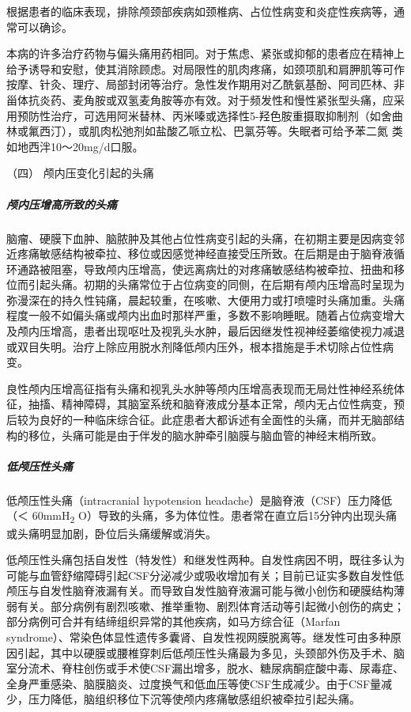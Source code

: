 根据患者的临床表现，排除颅颈部疾病如颈椎病、占位性病变和炎症性疾病等，通常可以确诊。

本病的许多治疗药物与偏头痛用药相同。对于焦虑、紧张或抑郁的患者应在精神上给予诱导和安慰，使其消除顾虑。对局限性的肌肉疼痛，如颈项肌和肩胛肌等可作按摩、针灸、理疗、局部封闭等治疗。急性发作期用对乙酰氨基酚、阿司匹林、非甾体抗炎药、麦角胺或双氢麦角胺等亦有效。对于频发性和慢性紧张型头痛，应采用预防性治疗，可选用阿米替林、丙米嗪或选择性5-羟色胺重摄取抑制剂（如舍曲林或氟西汀），或肌肉松弛剂如盐酸乙哌立松、巴氯芬等。失眠者可给予苯二氮{}
类如地西泮10～20mg/d口服。

\hypertarget{text00020.htmlux5cux23CHP1-7-4-4}{}
（四） 颅内压变化引起的头痛

\subparagraph{颅内压增高所致的头痛}

脑瘤、硬膜下血肿、脑脓肿及其他占位性病变引起的头痛，在初期主要是因病变邻近疼痛敏感结构被牵拉、移位或因感觉神经直接受压所致。在后期是由于脑脊液循环通路被阻塞，导致颅内压增高，使远离病灶的对疼痛敏感结构被牵拉、扭曲和移位而引起头痛。初期的头痛常位于占位病变的同侧，在后期有颅内压增高时呈现为弥漫深在的持久性钝痛，晨起较重，在咳嗽、大便用力或打喷嚏时头痛加重。头痛程度一般不如偏头痛或颅内出血时那样严重，多数不影响睡眠。随着占位病变增大及颅内压增高，患者出现呕吐及视乳头水肿，最后因继发性视神经萎缩使视力减退或双目失明。治疗上除应用脱水剂降低颅内压外，根本措施是手术切除占位性病变。

良性颅内压增高征指有头痛和视乳头水肿等颅内压增高表现而无局灶性神经系统体征，抽搐、精神障碍，其脑室系统和脑脊液成分基本正常，颅内无占位性病变，预后较为良好的一种临床综合征。此症患者大都诉述有全面性的头痛，而并无脑部结构的移位，头痛可能是由于伴发的脑水肿牵引脑膜与脑血管的神经末梢所致。

\subparagraph{低颅压性头痛}

低颅压性头痛（intracranial hypotension
headache）是脑脊液（CSF）压力降低（＜ 60mmH\textsubscript{2}
O）导致的头痛，多为体位性。患者常在直立后15分钟内出现头痛或头痛明显加剧，卧位后头痛缓解或消失。

低颅压性头痛包括自发性（特发性）和继发性两种。自发性病因不明，既往多认为可能与血管舒缩障碍引起CSF分泌减少或吸收增加有关；目前已证实多数自发性低颅压与自发性脑脊液漏有关。而导致自发性脑脊液漏可能与微小创伤和硬膜结构薄弱有关。部分病例有剧烈咳嗽、推举重物、剧烈体育活动等引起微小创伤的病史；部分病例可合并有结缔组织异常的其他疾病，如马方综合征（Marfan
syndrome）、常染色体显性遗传多囊肾、自发性视网膜脱离等。继发性可由多种原因引起，其中以硬膜或腰椎穿刺后低颅压性头痛最为多见，头颈部外伤及手术、脑室分流术、脊柱创伤或手术使CSF漏出增多，脱水、糖尿病酮症酸中毒、尿毒症、全身严重感染、脑膜脑炎、过度换气和低血压等使CSF生成减少。由于CSF量减少，压力降低，脑组织移位下沉等使颅内疼痛敏感组织被牵拉引起头痛。

